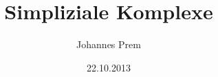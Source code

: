 
\subject{Seminar: Topologie vs. Kombinatorik}
\title{Simpliziale Komplexe}
\author{Johannes Prem}
\date{22.10.2013}

\maketitle
